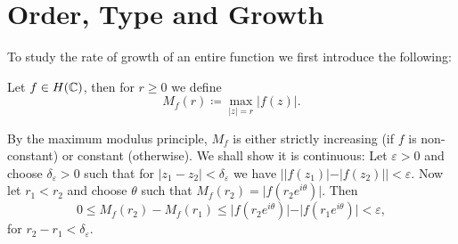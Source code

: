 \section{Order, Type and Growth}

To study the rate of growth of an entire function we first introduce the following:
\begin{definition}
    Let $f \in H(\mathbb{C})$, then for $r \geq 0$ we define
    \begin{equation*}
        M_f(r) \coloneqq \max_{\vert z \vert = r} \vert f(z) \vert.
    \end{equation*}
\end{definition}

\begin{remark}    
    By the maximum modulus principle, $M_f$ is either strictly increasing (if $f$ is non-constant) or constant (otherwise). We shall show it is continuous: Let $\varepsilon > 0$ and choose $\delta_\varepsilon > 0$ such that for ${\vert z_1 - z_2 \vert < \delta_\varepsilon}$ we have ${\left\vert \vert f(z_1) \vert - \vert f(z_2) \vert \right\vert < \varepsilon}$. Now let $r_1 < r_2$ and choose $\theta$ such that $M_f(r_2) = \vert f(r_2 e^{i \theta}) \vert$. Then
    \begin{equation*}
        0 \leq M_f(r_2) - M_f(r_1) \leq \vert f(r_2 e^{i \theta}) \vert - \vert f(r_1 e^{i \theta}) \vert < \varepsilon,
    \end{equation*}
    for $r_2 - r_1 < \delta_\varepsilon$.
\end{remark}




